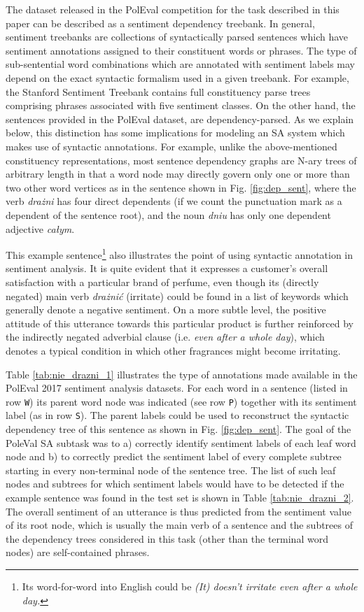 \documentclass[10pt, a4paper]{article}
\begin{document}
The dataset released in the PolEval competition for the task described in this paper can be described as a sentiment dependency treebank. In general, sentiment treebanks are collections of syntactically parsed sentences which have sentiment annotations assigned to their constituent words or phrases. The type of sub-sentential word combinations which are annotated with  sentiment labels may depend on the exact syntactic formalism used in a given treebank. For example, the Stanford Sentiment Treebank \cite{socher2013recursive} contains full constituency parse trees comprising phrases associated with five sentiment classes. On the other hand, the sentences provided in the PolEval dataset, are dependency-parsed. As we explain below, this distinction has some implications for modeling an SA system which makes use of syntactic annotations. For example, unlike the above-mentioned constituency representations, most sentence dependency graphs are N-ary trees of arbitrary length in that a word node may directly govern only one or more than two other word vertices as in the sentence shown in Fig. \ref{fig:dep_sent}, where the verb \textit{drażni} has four direct dependents (if we count the punctuation mark as a dependent of the sentence root), and the noun \textit{dniu} has only one dependent adjective \textit{całym}. 
\par This example sentence\footnote{Its word-for-word into English could be \textit{(It) doesn't irritate even after a whole day.}} also illustrates the point of using syntactic annotation in sentiment analysis. It is quite evident that it expresses a customer's overall satisfaction with a particular brand of perfume, even though its (directly negated) main verb \textit{drażnić} (irritate) could be found in a list of keywords which generally denote a negative sentiment. On a more subtle level, the positive attitude of this utterance towards this particular product is further reinforced by the indirectly negated adverbial clause (i.e. \textit{even after a whole day}), which denotes a typical condition in which other fragrances might become irritating.
\par Table \ref{tab:nie_drazni_1} illustrates the type of annotations made available in the PolEval 2017 sentiment analysis datasets. For each word in a sentence (listed in row \texttt{W}) its parent word node was indicated (see row \texttt{P}) together with its sentiment label (as in row \texttt{S}). The parent labels could be used to reconstruct the syntactic dependency tree of this sentence as shown in Fig. \ref{fig:dep_sent}. The goal of the PoleVal SA subtask was to  a) correctly identify sentiment labels of each leaf word node and b) to correctly predict the sentiment label of every complete subtree starting in every non-terminal node of the sentence tree. The list of such leaf nodes and subtrees for which sentiment labels would have to be detected if the example sentence was found in the test set is shown in Table \ref{tab:nie_drazni_2}. The overall sentiment of an utterance is thus predicted from the sentiment value of its root node, which is usually the main verb of a sentence and the subtrees of the dependency trees considered in this task (other than the terminal word nodes) are self-contained phrases. 
\end{document}
